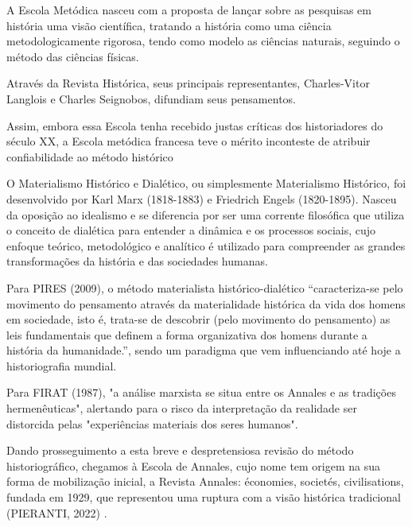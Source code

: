 A Escola Metódica nasceu com a proposta de  lançar sobre as pesquisas em história uma visão científica, tratando a história como uma ciência metodologicamente rigorosa, tendo como modelo as ciências naturais, seguindo o método das ciências físicas.

Através da Revista Histórica, seus principais representantes, Charles-Vitor Langlois e Charles Seignobos, difundiam seus pensamentos.


\noindent\begin{flushright}\mbox{\linespread{1}\selectfont\centering{}}\end{flushright}


Assim, embora essa Escola tenha recebido justas críticas dos historiadores do século XX, a Escola metódica francesa teve o mérito inconteste de atribuir confiabilidade ao método histórico

O Materialismo Histórico e Dialético, ou simplesmente Materialismo Histórico, foi desenvolvido  por Karl Marx (1818-1883) e Friedrich Engels (1820-1895). Nasceu da oposição ao idealismo e se diferencia por ser uma corrente filosófica que utiliza o conceito de dialética para entender a dinâmica e os processos sociais, cujo enfoque teórico, metodológico e analítico é utilizado para compreender as grandes transformações da história e das sociedades humanas.

Para  PIRES (2009), o método materialista histórico-dialético “caracteriza-se pelo movimento do pensamento através da materialidade histórica da vida dos homens em sociedade, isto é, trata-se de descobrir (pelo movimento do pensamento) as leis fundamentais que definem a forma organizativa dos homens durante a história da humanidade.”, sendo um paradigma que vem influenciando até hoje a historiografia mundial.

Para FIRAT (1987), "a análise marxista se situa entre os Annales e as tradições hermenêuticas", alertando para o risco da interpretação da realidade ser distorcida pelas "experiências materiais dos seres humanos".

Dando prosseguimento a esta breve e despretensiosa revisão do método historiográfico, chegamos à Escola de Annales, cujo nome tem origem na sua forma de mobilização inicial, a Revista Annales: économies, societés, civilisations, fundada em 1929, que representou uma ruptura com a visão histórica tradicional (PIERANTI, 2022) .

